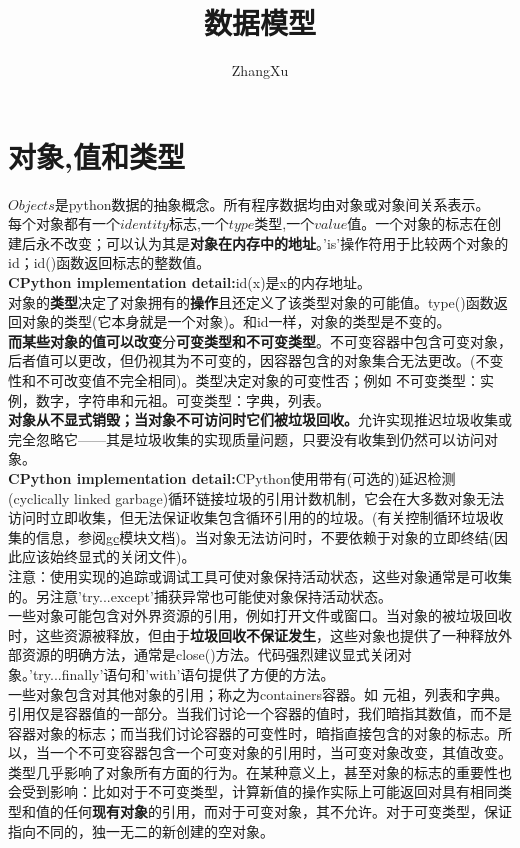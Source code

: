 \documentclass[10pt,UTF8]{ctexart}
\title{数据模型}
\author{ZhangXu}
\begin{document}
\maketitle
\section{对象,值和类型}
$Objects$是python数据的抽象概念。所有程序数据均由对象或对象间关系表示。\\
\indent 每个对象都有一个$identity$标志,一个$type$类型,一个$value$值。一个对象的标志在创建后永不改变；可以认为其是\textbf{对象在内存中的地址}。'is'操作符用于比较两个对象的id；id()函数返回标志的整数值。\\
\indent \textbf{CPython implementation detail:}id(x)是x的内存地址。\\
\indent 对象的\textbf{类型}决定了对象拥有的\textbf{操作}且还定义了该类型对象的可能值。type()函数返回对象的类型(它本身就是一个对象)。和id一样，对象的类型是不变的。\\
\indent \textbf{而某些对象的值可以改变}分\textbf{可变类型和不可变类型}。不可变容器中包含可变对象，后者值可以更改，但仍视其为不可变的，因容器包含的对象集合无法更改。(不变性和不可改变值不完全相同)。类型决定对象的可变性否；例如 不可变类型：实例，数字，字符串和元祖。可变类型：字典，列表。\\
\indent \textbf{对象从不显式销毁；当对象不可访问时它们被垃圾回收。}允许实现推迟垃圾收集或完全忽略它——其是垃圾收集的实现质量问题，只要没有收集到仍然可以访问对象。\\
\indent \textbf{CPython implementation detail:}CPython使用带有(可选的)延迟检测(cyclically linked garbage)循环链接垃圾的引用计数机制，它会在大多数对象无法访问时立即收集，但无法保证收集包含循环引用的的垃圾。(有关控制循环垃圾收集的信息，参阅\href{https://docs.python.org/3/library/gc.html#module-gc}{gc}模块文档)。当对象无法访问时，不要依赖于对象的立即终结(因此应该始终显式的关闭文件)。\\
\indent 注意：使用实现的追踪或调试工具可使对象保持活动状态，这些对象通常是可收集的。另注意'try...except'捕获异常也可能使对象保持活动状态。\\
\indent 一些对象可能包含对外界资源的引用，例如打开文件或窗口。当对象的被垃圾回收时，这些资源被释放，但由于\textbf{垃圾回收不保证发生}，这些对象也提供了一种释放外部资源的明确方法，通常是close()方法。代码强烈建议显式关闭对象。'try...finally'语句和'with'语句提供了方便的方法。\\
\indent 一些对象包含对其他对象的引用；称之为containers容器。如 元祖，列表和字典。引用仅是容器值的一部分。当我们讨论一个容器的值时，我们暗指其数值，而不是容器对象的标志；而当我们讨论容器的可变性时，暗指直接包含的对象的标志。所以，当一个不可变容器包含一个可变对象的引用时，当可变对象改变，其值改变。\\
\indent 类型几乎影响了对象所有方面的行为。在某种意义上，甚至对象的标志的重要性也会受到影响：比如对于不可变类型，计算新值的操作实际上可能返回对具有相同类型和值的任何\textbf{现有对象}的引用，而对于可变对象，其不允许。对于可变类型，保证指向不同的，独一无二的新创建的空对象。
\end{document}
